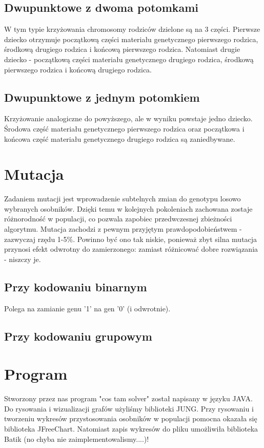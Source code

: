 \documentclass[11pt]{aghdpl}
\begin{document}
\section{Dwupunktowe z dwoma potomkami}
\label{sec:dwaDwa}
W tym typie krzyżowania chromosomy rodziców dzielone są na 3 części. Pierwsze dziecko otrzymuje początkową części materiału 
genetycznego pierwszego rodzica, środkową drugiego rodzica i końcową pierwszego rodzica. Natomiast drugie dziecko - 
początkową części materiału genetycznego drugiego rodzica, środkową pierwszego rodzica i końcową drugiego rodzica.

\section{Dwupunktowe z jednym potomkiem}
\label{sec:dwaJeden}
Krzyżowanie analogiczne do powyższego, ale w wyniku powstaje jedno dziecko. Środowa część materiału genetycznego pierwszego 
rodzica oraz początkowa i końcowa część materiału genetycznego drugiego rodzica są zaniedbywane.

\chapter{Mutacja}
\label{cha:mutation}
Zadaniem mutacji jest wprowadzenie subtelnych zmian do genotypu losowo wybranych osobników. Dzięki temu w kolejnych pokoleniach 
zachowana zostaje różnorodność w populacji, co pozwala zapobiec przedwczesnej zbieżności algorytmu. Mutacja zachodzi z 
pewnym przyjętym prawdopodobieństwem - zazwyczaj rzędu 1-5\%. Powinno być ono tak niskie, ponieważ zbyt silna mutacja przynosi 
efekt odwrotny do zamierzonego: zamiast różnicować dobre rozwiązania - niszczy je.

\section{Przy kodowaniu binarnym}
\label{sec:kodBin}
Polega na zamianie genu '1' na gen '0' (i odwrotnie).
\section{Przy kodowaniu grupowym}
\label{sec:kodGru}

\chapter{Program}
\label{cha:program}
Stworzony przez nas program "cos tam solver" został napisany w języku JAVA. Do rysowania i wizualizacji grafów użyliśmy biblioteki 
JUNG. Przy rysowaniu i tworzeniu wykresów przystosowania osobników w populacji pomocna okazała się biblioteka JFreeChart. Natomiast 
zapis wykresów do pliku umożliwiła biblioteka Batik (no chyba nie zaimplementowalismy....)!
\end{document}
